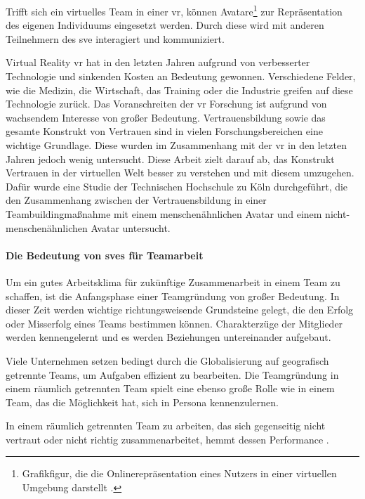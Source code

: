 \documentclass[a4paper,11pt]{article}%
\renewcommand{\\}{\vspace*{0.5\baselineskip} \newline}
\begin{document}
Trifft sich ein virtuelles Team in einer \ac{vr}, können Avatare\footnote{Grafikfigur, die die Onlinerepräsentation eines Nutzers in einer virtuellen Umgebung darstellt \citep[S. 196]{neitzel2010bin}.} zur Repräsentation des eigenen Individuums eingesetzt werden. Durch diese wird mit anderen Teilnehmern des \ac{sve} interagiert und kommuniziert.

Virtual Reality \ac{vr} hat in den letzten Jahren aufgrund von verbesserter Technologie und sinkenden Kosten an Bedeutung gewonnen. Verschiedene Felder, wie die Medizin, die Wirtschaft, das Training oder die Industrie greifen auf diese Technologie zurück. Das Voranschreiten der \ac{vr} Forschung ist aufgrund von wachsendem Interesse von großer Bedeutung. Vertrauensbildung sowie das gesamte Konstrukt von Vertrauen sind in vielen Forschungsbereichen eine wichtige Grundlage. Diese wurden im Zusammenhang mit der \ac{vr} in den letzten Jahren jedoch wenig untersucht. Diese Arbeit zielt darauf ab, das Konstrukt Vertrauen in der virtuellen Welt besser zu verstehen und mit diesem umzugehen. Dafür wurde eine Studie der Technischen Hochschule zu Köln durchgeführt, die den Zusammenhang zwischen der Vertrauensbildung in einer Teambuildingmaßnahme mit einem menschenähnlichen Avatar und einem nicht-menschenähnlichen Avatar untersucht.

\paragraph{Die Bedeutung von \ac{sve}s für Teamarbeit}
	Um ein gutes Arbeitsklima für zukünftige Zusammenarbeit in einem Team zu schaffen, ist die Anfangsphase einer Teamgründung von großer Bedeutung. In dieser Zeit werden wichtige richtungsweisende Grundsteine gelegt, die den Erfolg oder Misserfolg eines Teams bestimmen können. Charakterzüge der Mitglieder werden kennengelernt und es werden Beziehungen untereinander aufgebaut.
	
Viele Unternehmen setzen bedingt durch die Globalisierung auf geografisch getrennte Teams, um Aufgaben effizient zu bearbeiten. Die Teamgründung in einem räumlich getrennten Team spielt eine ebenso große Rolle wie in einem Team, das die Möglichkeit hat, sich in Persona kennenzulernen.
	
In einem räumlich getrennten Team zu arbeiten, das sich gegenseitig nicht vertraut oder nicht richtig zusammenarbeitet, hemmt dessen Performance \citep[S. 98-107]{huang1998supporting} \citep[S. 399-417]{turoff1993distributed}.
	
	
\end{document}
